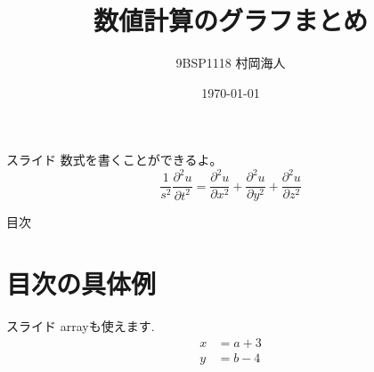 \documentclass[platex,dvipdfmx]{beamer}			%
\title{数値計算のグラフまとめ}
\author{9BSP1118 村岡海人}
\date{\today}
\begin{document}
\frame{\maketitle}

\begin{frame}{スライド}
数式を書くことができるよ。
\begin{equation}
    \frac{1}{s^{2}}\frac{\partial^{2} u}{\partial t^{2}} = \frac{\partial^{2} u}{\partial x^{2}} + \frac{\partial^{2} u}{\partial y^{2}} + \frac{\partial^{2} u}{\partial z^{2}}
\end{equation}
\end{frame}

\begin{frame}{目次}
    \tableofcontents
\end{frame}

\section{目次の具体例}
\begin{frame}{スライド}
arrayも使えます.
\begin{align}
    x &= a + 3 \\
    y &= b -4
\end{align}
\end{frame}

\end{document}
